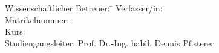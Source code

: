 \begin{titlepage}
\begin{center}
\begin{minipage}{\textwidth}
\begin{tabbing}
	Wissenschaftlicher Betreuer: \hspace{0.85cm}\=\kill
	Verfasser/in: \> \DerAutorDerArbeit \\[1.5mm]
	Matrikelnummer:  \\[1.5mm]
	Kurs: \> \DieKursbezeichnung \\[1.5mm]
	Studiengangsleiter: \> Prof. Dr.-Ing. habil. Dennis Pfisterer \\[1.5mm]
\end{tabbing}
\end{minipage}

\end{center}

\end{titlepage}